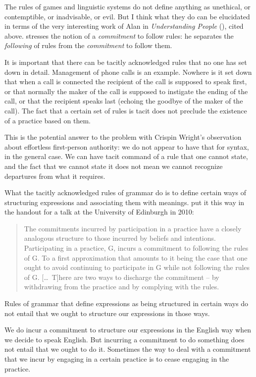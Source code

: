 \documentclass[output=paper]{langscibook}
\begin{document}
The  rules of games and linguistic systems do not define anything as unethical, or contemptible, or inadvisable, or evil.  But I think what they do can be elucidated in terms of the very interesting work of Alan {\Millar} in \textit{Understanding People} (\citeyear{Millar04}), cited above. {\Millar} stresses the notion of a \emph{commitment} to follow rules: he separates the \emph{following} of rules from the \emph{commitment} to follow them.

It is important that there can be tacitly acknowledged rules that no one has set down in detail. Management of phone calls is an example. Nowhere is it set down that when a call is connected the recipient of the call is supposed to speak first, or that normally the maker of the call is supposed to instigate the ending of the call, or that the recipient speaks last (echoing the goodbye of the maker of the call). The fact that a certain set of rules is tacit does not preclude the existence of a practice based on them.

This is the potential answer to the problem with Crispin Wright's observation about effortless first-person authority: we do not appear to have that for syntax, in the general case.  We can have tacit command of a rule that one cannot state, and the fact that we cannot state it does not mean we cannot recognize departures from what it requires.

What the tacitly acknowledged rules of grammar do is to define certain ways of structuring expressions and associating them with meanings. {\Millar} put it this way in the handout for a talk at the University of Edinburgh in 2010:

\begin{quote}
The commitments incurred by participation in a practice have a closely analogous structure to those incurred by beliefs and intentions. Participating in a practice, G, incurs a commitment to following the rules of G.  To a first approximation that amounts to it being the case that one ought to avoid continuing to participate in G while not following the rules of G.  [\ldots\ T]here are two ways to discharge the commitment -- by withdrawing from the practice and by complying with the rules. \end{quote} 

Rules of grammar that define expressions as being structured in certain ways do not entail that we ought to structure our expressions in those ways.

We do incur a commitment to structure our expressions in the English way when we decide to speak English.  But incurring a commitment to do something does not entail that we ought to do it.  Sometimes the way to deal with a commitment that we incur by engaging in a certain practice is to cease engaging in the practice.
\end{document}

